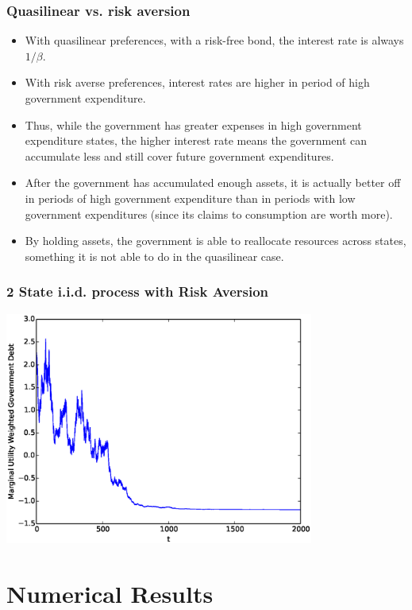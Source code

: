 \documentclass{beamer}
\begin{document}
%
\begin{frame}
	\frametitle{Quasilinear vs. risk aversion}
	\begin{itemize}
				\item  With  quasilinear preferences, with a risk-free bond, the interest rate is always $1/\beta$.
   \item With risk averse preferences, interest rates are higher in period of high government expenditure.
		\item  Thus, while the government has greater expenses in high government expenditure states, the higher interest rate means the government can  accumulate less and still  cover future government expenditures.
		\item  After the government has accumulated enough assets, it is actually better off in periods of high government expenditure than in periods with low government expenditures (since its claims to consumption are worth more).
		\item  By holding assets, the government is able to reallocate resources across states, something it is not able to do in the quasilinear case.
	\end{itemize}
\end{frame}

\begin{frame}
	\frametitle{2 State i.i.d. process with Risk Aversion}
	\begin{center}
	\includegraphics[width=4in]{Images/2stateiid.eps}
	\end{center}
\end{frame}

\section{Numerical Results}
\subsection{}
\end{document}
